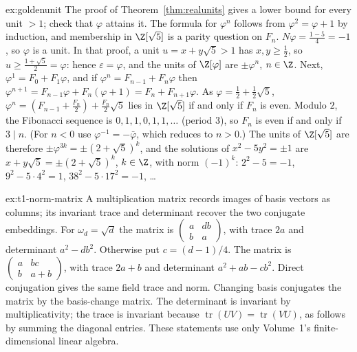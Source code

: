 \begin{solution}{ex:goldenunit}
\idea The proof of Theorem~\ref{thm:realunits} gives a lower bound for every unit $>1$; check that $\varphi$ attains it. The formula for $\varphi^n$ follows from $\varphi^2=\varphi+1$ by induction, and membership in $\Z[\sqrt5]$ is a parity question on $F_n$.
\writeup $N\varphi=\frac{1-5}4=-1$, so $\varphi$ is a unit. In that proof, a unit $u=x+y\sqrt5>1$ has $x,y\ge\frac12$, so $u\ge\frac{1+\sqrt5}2=\varphi$: hence $\varepsilon=\varphi$, and the units of $\Z[\varphi]$ are $\pm\varphi^n$, $n\in\Z$. Next, $\varphi^1=F_0+F_1\varphi$, and if $\varphi^n=F_{n-1}+F_n\varphi$ then $\varphi^{n+1}=F_{n-1}\varphi+F_n(\varphi+1)=F_n+F_{n+1}\varphi$. As $\varphi=\frac12+\frac12\sqrt5$, $\varphi^n=\left(F_{n-1}+\frac{F_n}2\right)+\frac{F_n}2\sqrt5$ lies in $\Z[\sqrt5]$ if and only if $F_n$ is even. Modulo $2$, the Fibonacci sequence is $0,1,1,0,1,1,\dots$ (period $3$), so $F_n$ is even if and only if $3\mid n$. (For $n<0$ use $\varphi^{-1}=-\bar\varphi$, which reduces to $n>0$.) The units of $\Z[\sqrt5]$ are therefore $\pm\varphi^{3k}=\pm(2+\sqrt5)^k$, and the solutions of $x^2-5y^2=\pm1$ are $x+y\sqrt5=\pm(2+\sqrt5)^k$, $k\in\Z$, with norm $(-1)^k$: $2^2-5=-1$, $9^2-5\cdot4^2=1$, $38^2-5\cdot17^2=-1$, \dots
\end{solution}

\begin{solution}{ex:t1-norm-matrix}
\idea A multiplication matrix records images of basis vectors as columns;
its invariant trace and determinant recover the two conjugate embeddings.
\writeup For $\omega_d=\sqrt d$ the matrix is
$\begin{pmatrix}a&db\\ b&a\end{pmatrix}$, with trace $2a$ and determinant
$a^2-db^2$. Otherwise put $c=(d-1)/4$. The matrix is
$\begin{pmatrix}a&bc\\ b&a+b\end{pmatrix}$, with trace $2a+b$ and determinant
$a^2+ab-cb^2$. Direct conjugation gives the same field trace and norm.
Changing basis conjugates the matrix by the basis-change matrix.
The determinant is invariant by multiplicativity; the trace is invariant
because $\operatorname{tr}(UV)=\operatorname{tr}(VU)$, as follows by
summing the diagonal entries. These statements use only Volume~1's
finite-dimensional linear algebra.
\end{solution}

